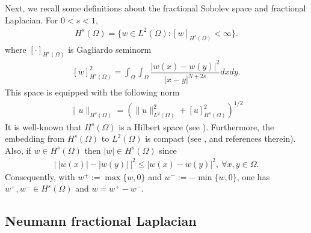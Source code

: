 \documentclass[a4paper,11pt]{amsart}
\theoremstyle{definition}
\def\O{\Omega}
\numberwithin{equation}{section}
\theoremstyle{definition}
\def\O{\Omega}
\begin{document}
Next, we recall some definitions about the fractional Sobolev space and fractional Laplacian. For $0<s<1$,
\begin{align*}
H^s(\O)=\{w\in L^2(\O):\left[w\right]_{H^s(\O)}<\infty\}.
\end{align*}
where $[\cdot]_{H^s(\O)}$ is Gagliardo seminorm
\begin{align*}
\left[w\right]_{H^s(\O)}^2=\int_{\O}\int_{\O}\dfrac{|w(x)-w(y)|^2}{|x-y|^{N+2s}}dxdy.
\end{align*}
This space is equipped with the following norm
\begin{align*}
\|u\|_{H^s(\O)}=\left(\|u\|^2_{L^2(\O)}+\left[u\right]_{H^s(\O)}^2\right)^{1/2}
\end{align*}
It is well-known that $H^s(\O)$ is a Hilbert space (see \cite[Chapter 7, p. 208]{adam_sobolev_1975}). Furthermore, the embedding from $H^s(\O)$ to $L^2(\O)$ is compact (see  \cite[Theorem 4.54]{demengel_functional_2012}, \cite[Theorem 7.1]{di_hitchhiker_2012} and references therein). Also, if $w\in H^s(\O)$ then $|w|\in H^s(\O)$  since
\begin{align*}
\left|~|w(x)|-|w(y)|~\right|^2\leq |w(x)-w(y)|^2,~\forall x,y\in\O.
\end{align*}
Consequently, with $w^+:=\max\{w,0\}$ and $w^-:=-\min\{w,0\}$, one has $w^+,w^-\in H^s(\O)$ and $w=w^+-w^-$.


\subsection{\bf Neumann fractional Laplacian}
\end{document}
